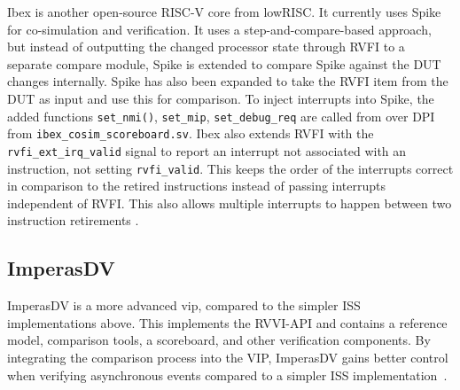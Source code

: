 Ibex is another open-source RISC-V core from lowRISC. It currently uses Spike for co-simulation and verification. It uses a step-and-compare-based approach, but instead of outputting the changed processor state through RVFI to a separate compare module, Spike is extended to compare Spike against the DUT changes internally. Spike has also been expanded to take the RVFI item from the DUT as input and use this for comparison. To inject interrupts into Spike, the added functions \lstinline{set_nmi()}, \lstinline{set_mip}, \lstinline{set_debug_req} are called from over DPI from \lstinline{ibex_cosim_scoreboard.sv}.
Ibex also extends RVFI with the \lstinline{rvfi_ext_irq_valid} signal to report an interrupt not associated with an instruction, not setting \lstinline{rvfi_valid}. This keeps the order of the interrupts correct in comparison to the retired instructions instead of passing interrupts independent of RVFI. This also allows multiple interrupts to happen between two instruction retirements \cite{ethzurichanduniversityofbolognaCosimulationSystem2023}. 

%    


\subsection{ImperasDV}
\label{sec:imperasdv}

ImperasDV is a more advanced \acrfull{vip}, compared to the simpler ISS implementations above. This implements the RVVI-API and contains a reference model, comparison tools, a scoreboard, and other verification components. By integrating the comparison process into the VIP, ImperasDV gains better control when verifying asynchronous events compared to a simpler ISS implementation~\cite{taylorAdvancedRISCVVerification2023}. 


